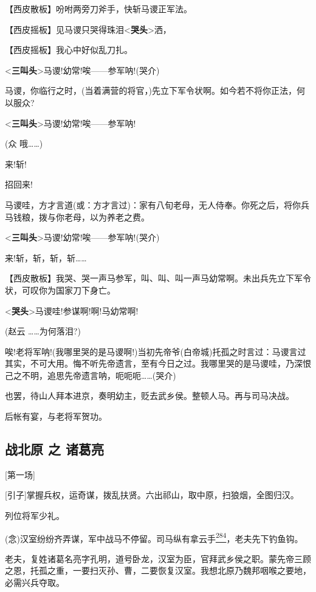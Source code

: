 【西皮散板】吩咐两旁刀斧手，快斩马谡正军法。

【西皮摇板】见马谡只哭得珠泪\textless{}\textbf{哭头}\textgreater{}洒，

【西皮摇板】我心中好似乱刀扎。

\textless{}\textbf{三叫头}\textgreater{}马谡!幼常!唉------参军呐!(哭介)

马谡，你临行之时，(当着满营的将官，)先立下军令状啊。如今若不将你正法，何以服众?

\textless{}\textbf{三叫头}\textgreater{}马谡!幼常!唉------参军呐!

(众 哦\ldots{}\ldots{})

来!斩!

招回来!

马谡哇，方才言道(或：方才言过)：家有八旬老母，无人侍奉。你死之后，将你兵马钱粮，拨与你老母，以为养老之费。

\textless{}\textbf{三叫头}\textgreater{}马谡!幼常!唉------参军呐!(哭介)

来!斩，斩，斩，斩\ldots{}\ldots{}

【西皮散板】我哭、哭一声马参军，叫、叫、叫一声马幼常啊。未出兵先立下军令状，可叹你为国家刀下身亡。

\textless{}\textbf{哭头}\textgreater{}马谡哇!参谋啊!啊!马幼常啊!

(赵云 \ldots{}\ldots{}为何落泪?)

唉!老将军呐!(我哪里哭的是马谡啊!)当初先帝爷(白帝城)托孤之时言过：马谡言过其实，不可大用。悔不听先帝遗言，至有今日之过。我哪里哭的是马谡哇，乃深恨己之不明，追思先帝遗言呐，呃呃呃\ldots{}\ldots{}(哭介)

也罢，待山人拜本进京，奏明幼主，贬去武乡侯。整顿人马。再与司马决战。

后帐有宴，与老将军贺功。

\hypertarget{ux6218ux5317ux539f-ux4e4b-ux8bf8ux845bux4eae}{%
\subsection{战北原 之
诸葛亮}\label{ux6218ux5317ux539f-ux4e4b-ux8bf8ux845bux4eae}}

{[}第一场{]}

{[}引子{]}掌握兵权，运奇谋，拨乱扶贤。六出祁山，取中原，扫狼烟，全图归汉。

列位将军少礼。

(念)汉室纷纷齐弄谋，军中战马不停留。司马纵有拿云手\protect\hyperlink{fn284}{\textsuperscript{284}}，老夫先下钓鱼钩。

老夫，复姓诸葛名亮字孔明，道号卧龙，汉室为臣，官拜武乡侯之职。蒙先帝三顾之恩，托孤之重，一要扫灭孙、曹，二要恢复汉室。我想北原乃魏邦咽喉之要地，必需兴兵夺取。

